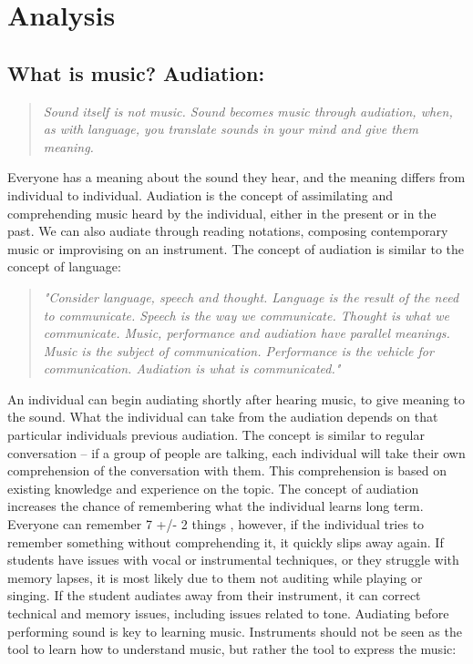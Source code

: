 \chapter{Analysis}\label{chap:analysis}
\section{What is music? Audiation:} 
\begin{quote}
	
	\textit{Sound itself is not music. Sound becomes music through audiation, when, as with language, you translate sounds in your mind and give them meaning.} \cite{audiation}\\
\end{quote}

Everyone has a meaning about the sound they hear, and the meaning differs from individual to individual.\cite{audiation} Audiation is the concept of assimilating and comprehending music heard by the individual, either in the present or in the past. We can also audiate through reading notations, composing contemporary music or improvising on an instrument.
The concept of audiation is similar to the concept of language\cite{audiation}: \\

\begin{quote}
	\textit{"Consider language, speech and thought. Language is the result of the need to communicate. Speech is the way we communicate. Thought is what we communicate. Music, performance and audiation have parallel meanings. Music is the subject of communication. Performance is the vehicle for communication. Audiation is what is communicated."} \cite{audiation}\\
\end{quote}

An individual can begin audiating shortly after hearing music, to give meaning to the sound. What the individual can take from the audiation depends on that particular individuals previous audiation.\cite{audiation} The concept is similar to regular conversation – if a group of people are talking, each individual will take their own comprehension of the conversation with them. This comprehension is based on existing knowledge and experience on the topic.\cite{audiation} 
The concept of audiation increases the chance of remembering what the individual learns long term. Everyone can remember 7 +/- 2 things \cite{gestalt}, however, if the individual tries to remember something without comprehending it, it quickly slips away again. If students have issues with vocal or instrumental techniques, or they struggle with memory lapses, it is most likely due to them not auditing while playing or singing. If the student audiates away from their instrument, it can correct technical and memory issues, including issues related to tone. Audiating before performing sound is key to learning music. Instruments should not be seen as the tool to learn how to understand music, but rather the tool to express the music\cite{audiation}:\\

